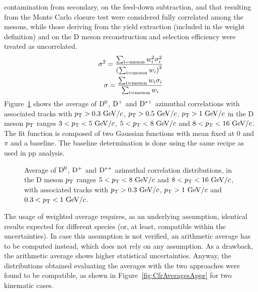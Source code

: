 contamination from secondary, on the feed-down subtraction, and that resulting from the Monte Carlo closure test were considered fully correlated among
the mesons, while those deriving from the yield extraction (included in the weight definition) and on the D meson reconstruction and selection efficiency were treated as uncorrelated.
\begin{eqnarray}
  \sigma^{2}=\frac{\sum_{\rm i=meson}w_{i}^{2}\sigma^{2}_{i}}{\left( \sum_{\rm i=meson}w_{i}\right)^{2}}  \label{eqavsystuncor}\\
  \sigma=\frac{\sum_{\rm i=meson}w_{i}\sigma_{i}}{ \sum_{\rm i=meson}w_{i}}   \label{eqavsystcor}
\end{eqnarray}
Figure~\ref{fig:DmesonAverage} shows the average of ${\rm D^0}$, ${\rm D^+}$ and ${\rm D^{*+}}$ azimuthal correlations with
associated tracks with $p_{\rm T}>0.3~\mathrm{GeV}/c$, $p_{\rm T}>0.5~\mathrm{GeV}/c$, $p_{\rm T}>1~\mathrm{GeV}/c$ in the D meson $p_{\rm T}$ ranges $3<p_{\rm T}<5~\mathrm{GeV}/c$, $5<p_{\rm T}<8~\mathrm{GeV}/c$
and $8<p_{\rm T}<16~\mathrm{GeV}/c$. The fit function is composed of two Gaussian functions with mean fixed at 0 and $\pi$ and a baseline. The baseline determination is done using the same recipe as used in pp analysis.

\begin{figure}[h]
\centering
 \caption{Average of ${\rm D^0}$, ${\rm D^+}$ and ${\rm D^{*+}}$ azimuthal correlation distributions, in the D meson $p_{\rm T}$ ranges $5<p_{\rm T}<8~\mathrm{GeV}/c$ and $8<p_{\rm T}<16~\mathrm{GeV}/c$, with associated tracks with $p_{\rm T}>0.3~\mathrm{GeV}/c$, $p_{\rm T}>1~\mathrm{GeV}/c$ and $0.3 < p_{\rm T} < 1~\mathrm{GeV}/c$.} \label{fig:DmesonAverage}
\end{figure}

The usage of weighted average requires, as an underlying assumption, identical results expected for different species (or, at least, compatible within the uncertainties). In case this assumption is not verified, an arithmetic average has to be computed instead, which does not rely on any assumption. As a drawback, the arithmetic average shows higher statistical uncertainties. Anyway, the distributions obtained evaluating the averages with the two approaches were found to be compatible, as shown in Figure~\ref{fig:CfrAveragesAppr} for two kinematic cases.


